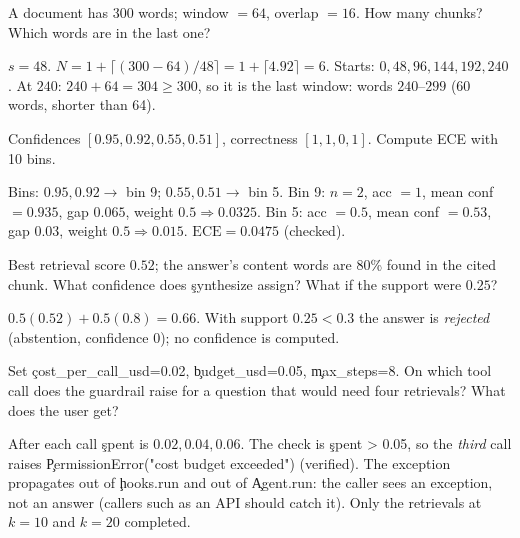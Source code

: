 \begin{problem}
A document has 300 words; window $=64$, overlap $=16$. How many chunks? Which words are in the last one?
\end{problem}
\begin{solution}
$s=48$. $N=1+\lceil(300-64)/48\rceil=1+\lceil4.92\rceil=6$. Starts: $0,48,96,144,192,240$. At $240$: $240+64=304\ge300$, so it is the last window: words $240$--$299$ (60 words, shorter than 64).
\end{solution}

\begin{problem}[ECE]
Confidences $[0.95,0.92,0.55,0.51]$, correctness $[1,1,0,1]$. Compute ECE with 10 bins.
\end{problem}
\begin{solution}
Bins: $0.95,0.92\to$ bin 9; $0.55,0.51\to$ bin 5. Bin 9: $n=2$, acc $=1$, mean conf $=0.935$, gap $0.065$, weight $0.5\Rightarrow0.0325$. Bin 5: acc $=0.5$, mean conf $=0.53$, gap $0.03$, weight $0.5\Rightarrow0.015$. $\mathrm{ECE}=0.0475$ (checked).
\end{solution}

\begin{problem}
Best retrieval score $0.52$; the answer's content words are 80\% found in the cited chunk. What confidence does \c{synthesize} assign? What if the support were $0.25$?
\end{problem}
\begin{solution}
$0.5(0.52)+0.5(0.8)=0.66$. With support $0.25<0.3$ the answer is \emph{rejected} (abstention, confidence $0$); no confidence is computed.
\end{solution}

\begin{problem}
Set \c{cost\_per\_call\_usd=0.02}, \c{budget\_usd=0.05}, \c{max\_steps=8}. On which tool call does the guardrail raise for a question that would need four retrievals? What does the user get?
\end{problem}
\begin{solution}
After each call \c{spent} is $0.02,0.04,0.06$. The check is \c{spent > 0.05}, so the \emph{third} call raises \c{PermissionError("cost budget exceeded")} (verified). The exception propagates out of \c{hooks.run} and out of \c{Agent.run}: the caller sees an exception, not an answer (callers such as an API should catch it). Only the retrievals at $k=10$ and $k=20$ completed.
\end{solution}


